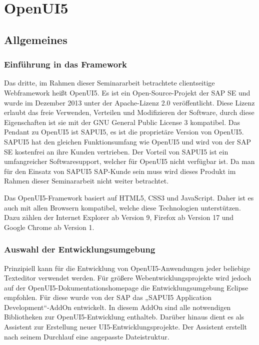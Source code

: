 
\chapter{OpenUI5}
\label{ch:openUI5}

\section{Allgemeines}

\subsection{Einführung in das Framework}

Das dritte, im Rahmen dieser Seminararbeit betrachtete clientseitige Webframework heißt OpenUI5. Es ist ein Open-Source-Projekt der SAP SE und wurde im Dezember 2013 unter der Apache-Lizenz 2.0 veröffentlicht. Diese Lizenz erlaubt das freie Verwenden, Verteilen und Modifizieren der Software, durch diese Eigenschaften ist sie mit der GNU General Public License 3 kompatibel. Das Pendant zu OpenUI5 ist SAPUI5, es ist die proprietäre Version von OpenUI5. SAPUI5 hat den gleichen Funktionsumfang wie OpenUI5 und wird von der SAP SE kostenfrei an ihre Kunden vertrieben. Der Vorteil von SAPUI5 ist ein umfangreicher Softwaresupport, welcher für OpenUI5 nicht verfügbar ist. Da man für den Einsatz von SAPUI5 SAP-Kunde sein muss wird dieses Produkt im Rahmen dieser Seminararbeit nicht weiter betrachtet.

Das OpenUI5-Framework basiert auf HTML5, CSS3 und JavaScript. Daher ist es auch mit allen Browsern kompatibel, welche diese Technologien unterstützen. Dazu zählen der Internet Explorer ab Version 9, Firefox ab Version 17 und Google Chrome ab Version 1.\autocites[vgl.][6]{SAP2013}

\subsection{Auswahl der Entwicklungsumgebung}

Prinzipiell kann für die Entwicklung von OpenUI5-Anwendungen jeder beliebige Texteditor verwendet werden. Für größere Webentwicklungsprojekte wird jedoch auf der OpenUI5-Dokumentationshomepage die Entwicklungsumgebung Eclipse empfohlen. Für diese wurde von der SAP das „SAPUI5 Application Development“-AddOn entwickelt. In diesem AddOn sind alle notwendigen Bibliotheken zur OpenUI5-Entwicklung enthalteb. Darüber hinaus dient es als Assistent zur Erstellung neuer UI5-Entwicklungsprojekte. Der Assistent erstellt nach seinem Durchlauf eine angepasste Dateistruktur. 

